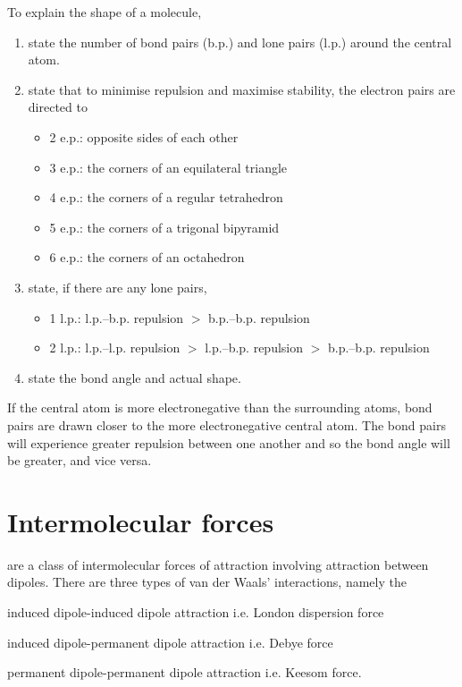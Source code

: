 \documentclass[Chemistry.tex]{subfiles}
\begin{document}
To explain the shape of a molecule, \begin{enumerate}
\item state the number of bond pairs (b.p.) and lone pairs (l.p.) around the central atom.
\item state that to minimise repulsion and maximise stability, the electron pairs are directed to\begin{itemize}
\item 2 e.p.: opposite sides of each other
\item 3 e.p.: the corners of an equilateral triangle
\item 4 e.p.: the corners of a regular tetrahedron
\item 5 e.p.: the corners of a trigonal bipyramid
\item 6 e.p.: the corners of an octahedron\end{itemize}
\item state, if there are any lone pairs,\begin{itemize}
\item 1 l.p.: l.p.--b.p. repulsion \(>\) b.p.--b.p. repulsion
\item 2 l.p.: l.p.--l.p. repulsion \(>\) l.p.--b.p. repulsion \(>\) b.p.--b.p. repulsion\end{itemize}
\item state the bond angle and actual shape.\end{enumerate}

If the central atom is more electronegative than the surrounding atoms, bond pairs are drawn closer to the more electronegative central atom. The bond pairs will experience greater repulsion between one another and so the bond angle will be greater, and vice versa.
\section{Intermolecular forces}
 are a class of intermolecular forces of attraction involving attraction between dipoles. There are three types of van der Waals' interactions, namely the \begin{slinenum}
\item induced dipole-induced dipole attraction i.e. London dispersion force
\item induced dipole-permanent dipole attraction i.e. Debye force
\item permanent dipole-permanent dipole attraction i.e. Keesom force.\end{slinenum}
\end{document}
